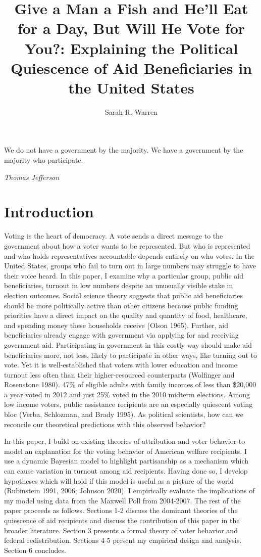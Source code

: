 \documentclass[12pt]{paper}
\title{Give a Man a Fish and He'll Eat for a Day, But Will He Vote for You?: Explaining the Political Quiescence of Aid Beneficiaries in the United States}
\author{Sarah R. Warren}
\date{}
\begin{document}
\maketitle

\setlength{}
\epigraph{We do not have a government by the majority. We have a government by the majority who participate.}{\textit{Thomas Jefferson}}

\doublespacing
\section*{Introduction}
Voting is the heart of democracy. A vote sends a direct message to the government about how a voter wants to be represented. But who is represented and who holds representatives accountable depends entirely on who votes. In the United States, groups who fail to turn out in large numbers may struggle to have their voice heard. In this paper, I examine why a particular group, public aid beneficiaries, turnout in low numbers despite an unusually visible stake in election outcomes.  Social science theory suggests that public aid beneficiaries should be more politically active than other citizens because public funding priorities have a direct impact on the quality and quantity of food, healthcare, and spending money these households receive (Olson 1965). Further, aid beneficiaries already engage with government via applying for and receiving government aid. Participating in government in this costly way should make aid beneficiaries more, not less, likely to participate in other ways, like turning out to vote. Yet it is well-established that voters with lower education and income turnout less often than their higher-resourced counterparts (Wolfinger and Rosenstone 1980). 47\% of eligible adults with family incomes of less than \$20,000 a year voted in 2012 and just 25\% voted in the 2010 midterm elections. Among low income voters, public assistance recipients are an especially quiescent voting bloc (Verba, Schlozman, and Brady 1995). As political scientists, how can we reconcile our theoretical predictions with this observed behavior? 

In this paper, I build on existing theories of attribution and voter behavior to model an explanation for the voting behavior of American welfare recipients. I use a dynamic Bayesian model to highlight partisanship as a mechanism which can cause variation in turnout among aid recipients. Having done so, I develop hypotheses which will hold if this model is useful as a picture of the world (Rubinstein 1991, 2006; Johnson 2020). I empirically evaluate the implications of my model using data from the Maxwell Poll from 2004-2007. The rest of the paper proceeds as follows. Sections 1-2 discuss the dominant theories of the quiescence of aid recipients and discuss the contribution of this paper in the broader literature. Section 3 presents a formal theory of voter behavior and federal redistribution. Sections 4-5 present my empirical design and analysis. Section 6 concludes.
\end{document}
